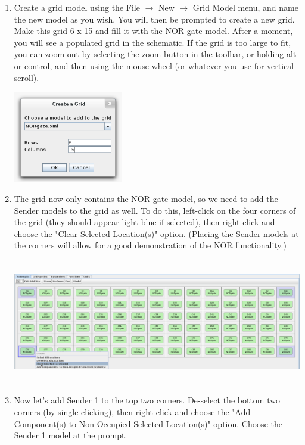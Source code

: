 \documentclass[titlepage,11pt]{article}
\begin{document}
\begin{enumerate}

\item Create a grid model using the File $\rightarrow$ New $\rightarrow$ Grid Model menu, and name the new model as you wish. You will then be prompted to create a new grid.  Make this grid 6 x 15 and fill it with the NOR gate model.  After a moment, you will see a populated grid in the schematic.  If the grid is too large to fit, you can zoom out by selecting the zoom button in the toolbar, or holding alt or control, and then using the mouse wheel (or whatever you use for vertical scroll).  

\includegraphics[height=40mm]{screenshots/newgrid/create_grid}

\item The grid now only contains the NOR gate model, so we need to add the Sender models to the grid as well.  To do this, left-click on the four corners of the grid (they should appear light-blue if selected), then right-click and choose the "Clear Selected Location(s)" option.  (Placing the Sender models at the corners will allow for a good demonstration of the NOR functionality.)

\includegraphics[height=55mm]{screenshots/newgrid/clear_locations}

\item Now let's add Sender 1 to the top two corners.  De-select the bottom two corners (by single-clicking), then right-click and choose the "Add Component(s) to Non-Occupied Selected Location(s)" option.  Choose the Sender 1 model at the prompt.


\end{enumerate}
\end{document}
